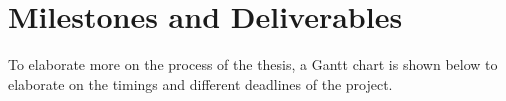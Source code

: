 \section{Milestones and Deliverables}
To elaborate more on the process of the thesis, a Gantt chart is shown below to elaborate on the timings and different deadlines of the project.